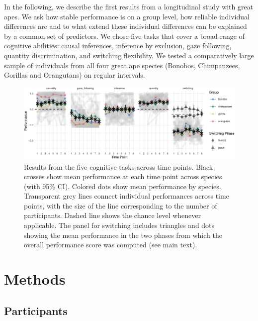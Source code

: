 \documentclass[10pt, letterpaper]{article}
\newenvironment{CodeChunk}{}{}
\begin{document}
In the following, we describe the first results from a longitudinal
study with great apes. We ask how stable performance is on a group
level, how reliable individual differences are and to what extend these
individual differences can be explained by a common set of predictors.
We chose five tasks that cover a broad range of cognitive abilities:
causal inferences, inference by exclusion, gaze following, quantity
discrimination, and switching flexibility. We tested a comparatively
large sample of individuals from all four great ape species (Bonobos,
Chimpanzees, Gorillas and Orangutans) on regular intervals.

\begin{CodeChunk}
\begin{figure}[h]

{\centering \includegraphics{figs/perfplot-1} 

}

\caption[Results from the five cognitive tasks across time points]{Results from the five cognitive tasks across time points. Black crosses show mean performance at each time point across species (with 95\% CI). Colored dots show mean performance by species. Transparent grey lines connect individual performances across time points, with the size of the line corresponding to the number of participants. Dashed line shows the chance level whenever applicable. The panel for switching includes triangles and dots showing the mean performance in the two phases from which the overall performance score was computed (see main text).}\label{fig:perfplot}
\end{figure}
\end{CodeChunk}

\hypertarget{methods}{%
\section{Methods}\label{methods}}

\hypertarget{participants}{%
\subsection{Participants}\label{participants}}
\end{document}

